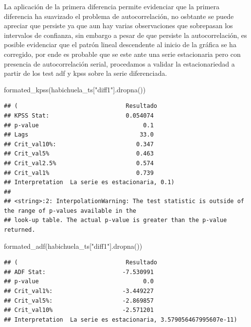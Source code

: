 \documentclass[
]{book}
\newenvironment{Shaded}{\begin{snugshade}}{\end{snugshade}}
\newcommand{\NormalTok}[1]{#1}
\newcommand{\StringTok}[1]{\textcolor[rgb]{0.31,0.60,0.02}{#1}}
\begin{document}
La aplicación de la primera diferencia permite evidenciar que la primera diferencia ha suavizado el problema de autocorrelación, no osbtante se puede apreciar que persiste ya que aun hay varias observaciones que sobrepasan los intervalos de confianza, sin embargo a pesar de que persiste la autocorrelación, es posible evidenciar que el patrón lineal descendente al inicio de la gráfica se ha corregido, por ende es probable que se este ante una serie estacionaria pero con presencia de autocorrelación serial, procedamos a validar la estacionariedad a partir de los test adf y kpss sobre la serie diferenciada.

\begin{Shaded}
\begin{Highlighting}[]


\NormalTok{formated\_kpss(habichuela\_ts[}\StringTok{"diff1"}\NormalTok{].dropna())}
\end{Highlighting}
\end{Shaded}

\begin{verbatim}
## (                               Resultado
## KPSS Stat:                      0.054074
## p-value                              0.1
## Lags                                33.0
## Crit_val10%:                       0.347
## Crit_val5%                         0.463
## Crit_val2.5%                       0.574
## Crit_val1%                         0.739
## Interpretation  La serie es estacionaria, 0.1)
## 
## <string>:2: InterpolationWarning: The test statistic is outside of the range of p-values available in the
## look-up table. The actual p-value is greater than the p-value returned.
\end{verbatim}

\begin{Shaded}
\begin{Highlighting}[]
\NormalTok{formated\_adf(habichuela\_ts[}\StringTok{"diff1"}\NormalTok{].dropna())}
\end{Highlighting}
\end{Shaded}

\begin{verbatim}
## (                               Resultado
## ADF Stat:                      -7.530991
## p-value                              0.0
## Crit_val1%:                    -3.449227
## Crit_val5%:                    -2.869857
## Crit_val10%                    -2.571201
## Interpretation  La serie es estacionaria, 3.579056467995607e-11)
\end{verbatim}
\end{document}
